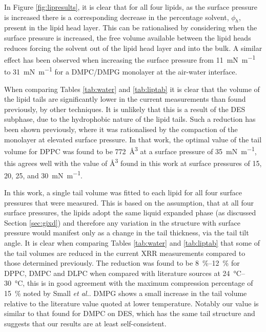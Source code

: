 \documentclass[twocolumn,a4paper]{paper}
\begin{document}
In Figure \ref{fig:lipresults}, it is clear that for all four lipids, as the surface pressure is increased there is a corresponding decrease in the percentage solvent, $\phi_h$, present in the lipid head layer.
This can be rationalised by considering when the surface pressure is increased, the free volume available between the lipid heads reduces forcing the solvent out of the lipid head layer and into the bulk.
A similar effect has been observed when increasing the surface pressure from \SI{11}{\milli\newton\per\meter} to \SI{31}{\milli\newton\per\meter} for a DMPC/DMPG monolayer at the air-water interface\cite{Bayerl1990}.

When comparing Tables \ref{tab:water} and \ref{tab:liptab} it is clear that the volume of the lipid tails are significantly lower in the current measurements than found previously, by other techniques.
It is unlikely that this is a result of the DES subphase, due to the hydrophobic nature of the lipid tails.
Such a reduction has been shown previously\cite{Campbell2018}, where it was rationalised by the compaction of the monolayer at elevated surface pressure.
In that work, the optimal value of the tail volume for DPPC was found to be \SI{772}{\cubic\angstrom} at a surface pressure of \SI{35}{\milli\newton\per\meter}, this agrees well with the value of \si{\cubic\angstrom} found in this work at surface pressures of 15, 20, 25, and \SI{30}{\milli\newton\per\meter}.

In this work, a single tail volume was fitted to each lipid for all four surface pressures that were measured.
This is based on the assumption, that at all four surface pressures, the lipids adopt the same liquid expanded phase (as discussed Section \ref{sec:gixd}) and therefore any variation in the structure with surface pressure would manifest only as a change in the tail thickness, via the tail tilt angle.
It is clear when comparing Tables \ref{tab:water} and \ref{tab:liptab} that some of the tail volumes are reduced in the current XRR measurements compared to those determined previously.
The reduction was found to be \SIrange{8}{12}{\percent} for DPPC, DMPC and DLPC when compared with literature sources at \SIrange{24}{30}{\celsius}, this is in good agreement with the maximum compression percentage of \SI{15}{\percent} noted by Small \emph{et al.}\cite{Small1984}. DMPG shows a small increase in the tail volume relative to the literature value quoted at lower temperature.
Notably our value is similar to that found for DMPC on DES, which has the same tail structure and suggests that our results are at least self-consistent.
\end{document}
